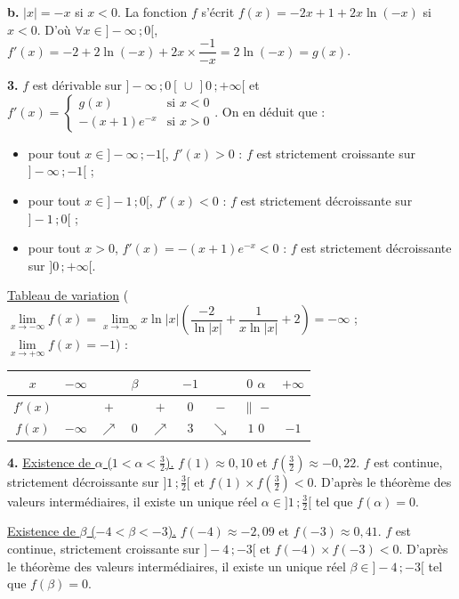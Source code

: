 \documentclass[11pt]{article}
\begin{document}
\textbf{b.} $|x| = -x$ si $x < 0$. La fonction $f$ s'écrit $f(x) = -2x + 1 + 2x\ln(-x)$ si $x < 0$. D'où $\forall x \in ]-\infty\,;0[$, $f'(x) = -2 + 2\ln(-x) + 2x \times \dfrac{-1}{-x} = 2\ln(-x) = g(x)$.

\textbf{3.} $f$ est dérivable sur $]-\infty\,;0[\,\cup\,]0\,;+\infty[$ et $f'(x) = \begin{cases} g(x) & \text{si } x < 0 \\ -(x+1)e^{-x} & \text{si } x > 0 \end{cases}$. On en déduit que :
\begin{itemize}
  \item pour tout $x \in ]-\infty\,;-1[$, $f'(x) > 0$ : $f$ est strictement croissante sur $]-\infty\,;-1[$ ;
  \item pour tout $x \in ]-1\,;0[$, $f'(x) < 0$ : $f$ est strictement décroissante sur $]-1\,;0[$ ;
  \item pour tout $x > 0$, $f'(x) = -(x+1)e^{-x} < 0$ : $f$ est strictement décroissante sur $]0\,;+\infty[$.
\end{itemize}

\underline{Tableau de variation} ($\lim\limits_{x\to-\infty} f(x) = \lim\limits_{x\to-\infty} x\ln|x|\left(\dfrac{-2}{\ln|x|} + \dfrac{1}{x\ln|x|} + 2\right) = -\infty$ ; $\lim\limits_{x\to+\infty} f(x) = -1$) :
\begin{center}\renewcommand{\arraystretch}{1.4}
\begin{tabular}{|c|cccccccc|}
\hline
$x$ & $-\infty$ & & $\beta$ & & $-1$ & & $0$ \quad $\alpha$ & $+\infty$ \\
\hline
$f'(x)$ & & $+$ & & $+$ & $0$ & $-$ & $\|$ \quad\; $-$ & \\
\hline
$f(x)$ & $-\infty$ & $\nearrow$ & $0$ & $\nearrow$ & $3$ & $\searrow$ & $1$ \quad $0$ & $-1$ \\
\hline
\end{tabular}
\end{center}

\textbf{4.} \underline{Existence de $\alpha$ ($1 < \alpha < \frac{3}{2}$).} $f(1) \approx 0{,}10$ et $f\left(\frac{3}{2}\right) \approx -0{,}22$. $f$ est continue, strictement décroissante sur $]1\,;\frac{3}{2}[$ et $f(1) \times f\left(\frac{3}{2}\right) < 0$. D'après le théorème des valeurs intermédiaires, il existe un unique réel $\alpha \in ]1\,;\frac{3}{2}[$ tel que $f(\alpha) = 0$.

\underline{Existence de $\beta$ ($-4 < \beta < -3$).} $f(-4) \approx -2{,}09$ et $f(-3) \approx 0{,}41$. $f$ est continue, strictement croissante sur $]-4\,;-3[$ et $f(-4) \times f(-3) < 0$. D'après le théorème des valeurs intermédiaires, il existe un unique réel $\beta \in ]-4\,;-3[$ tel que $f(\beta) = 0$.
\end{document}
